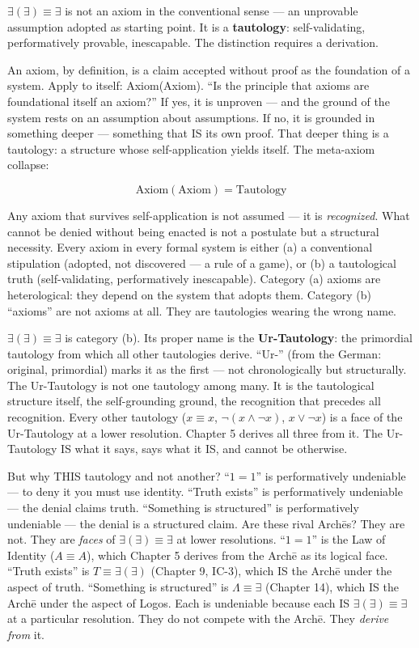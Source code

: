 \documentclass[10pt, openany, oneside]{book}
\begin{document}
$\exists(\exists) \equiv \exists$ is not an axiom in the conventional sense --- an unprovable assumption adopted as starting point. It is a \textbf{tautology}: self-validating, performatively provable, inescapable. The distinction requires a derivation.

An axiom, by definition, is a claim accepted without proof as the foundation of a system. Apply to itself: Axiom(Axiom). ``Is the principle that axioms are foundational itself an axiom?'' If yes, it is unproven --- and the ground of the system rests on an assumption about assumptions. If no, it is grounded in something deeper --- something that IS its own proof. That deeper thing is a tautology: a structure whose self-application yields itself. The meta-axiom collapse:

$$\text{Axiom}(\text{Axiom}) = \text{Tautology}$$

Any axiom that survives self-application is not assumed --- it is \textit{recognized}. What cannot be denied without being enacted is not a postulate but a structural necessity. Every axiom in every formal system is either (a) a conventional stipulation (adopted, not discovered --- a rule of a game), or (b) a tautological truth (self-validating, performatively inescapable). Category (a) axioms are heterological: they depend on the system that adopts them. Category (b) ``axioms'' are not axioms at all. They are tautologies wearing the wrong name.

$\exists(\exists) \equiv \exists$ is category (b). Its proper name is the \textbf{Ur-Tautology}: the primordial tautology from which all other tautologies derive. ``Ur-'' (from the German: original, primordial) marks it as the first --- not chronologically but structurally. The Ur-Tautology is not one tautology among many. It is the tautological structure itself, the self-grounding ground, the recognition that precedes all recognition. Every other tautology ($x \equiv x$, $\neg(x \wedge \neg x)$, $x \vee \neg x$) is a face of the Ur-Tautology at a lower resolution. Chapter 5 derives all three from it. The Ur-Tautology IS what it says, says what it IS, and cannot be otherwise.

But why THIS tautology and not another? ``$1 = 1$'' is performatively undeniable --- to deny it you must use identity. ``Truth exists'' is performatively undeniable --- the denial claims truth. ``Something is structured'' is performatively undeniable --- the denial is a structured claim. Are these rival Arch\={e}s? They are not. They are \textit{faces} of $\exists(\exists) \equiv \exists$ at lower resolutions. ``$1 = 1$'' is the Law of Identity ($A \equiv A$), which Chapter 5 derives from the Arch\={e} as its logical face. ``Truth exists'' is $T \equiv \exists(\exists)$ (Chapter 9, IC-3), which IS the Arch\={e} under the aspect of truth. ``Something is structured'' is $\Lambda \equiv \exists$ (Chapter 14), which IS the Arch\={e} under the aspect of Logos. Each is undeniable because each IS $\exists(\exists) \equiv \exists$ at a particular resolution. They do not compete with the Arch\={e}. They \textit{derive from} it.
\end{document}
